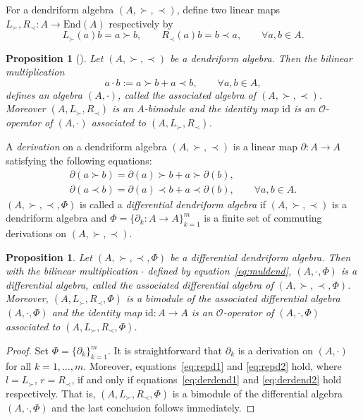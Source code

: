 \documentclass[pdftex]{sigma}
\numberwithin{equation}{section}
\newtheorem{Proposition}[Theorem]{Proposition}
{ \theoremstyle{definition}
	\newtheorem{Definition}[Theorem]{Definition}
	\newtheorem{Note}[Theorem]{Note}
	\newtheorem{Example}[Theorem]{Example}
	\newtheorem{Remark}[Theorem]{Remark} }
\newcommand{\id}{\mathrm{id}}
\newcommand{\End}{\mathrm{End}}
\begin{document}
For a dendriform algebra $(A, \succ, \prec)$, define two linear
maps $L_\succ, R_\prec\colon A \to \End(A)$ respectively by
\begin{equation*}
	L_\succ (a)b = a \succ b, \qquad R_\prec(a)b = b\prec a,\qquad \forall a, b\in A.
\end{equation*}

\begin{Proposition}[\cite{BaiDouble,Loday2001Dialgebras}]
 Let $(A, \succ, \prec)$ be a dendriform algebra.
 Then the bilinear multiplication
 \begin{equation}
 a \cdot b := a \succ b + a \prec b, \qquad \forall a, b \in A, \label{eq:muldend}
 \end{equation}
 defines an algebra $(A, \cdot)$, called the \textit{associated algebra} of $(A, \succ, \prec)$.
 Moreover $(A, L_\succ, R_\prec)$ is an $A$-bimodule and
 the identity map $\id$ is an $\mathcal{O}$-operator of $(A, \cdot)$ associated to $(A, L_\succ, R_\prec)$.
\end{Proposition}


\begin{Definition}
	A \textit{derivation} on a dendriform algebra $(A, \succ, \prec)$ is a linear map $\partial\colon A\rightarrow A$ satisfying the following equations:
 \begin{gather}
 \partial(a \succ b) = \partial(a) \succ b + a \succ \partial(b), \label{eq:derdend1} \\
 \partial(a \prec b) = \partial(a) \prec b + a \prec \partial(b), \qquad \forall a, b \in A. \label{eq:derdend2}
 \end{gather}
 $(A, \succ, \prec, \Phi)$ is called a \textit{differential dendriform algebra} if
 $(A, \succ, \prec)$ is a dendriform algebra and $\Phi = \{\partial_k\colon A \to A\}_{k=1}^m$ is a finite set of commuting derivations on $(A, \succ, \prec)$.
\end{Definition}

\begin{Proposition}\label{pro:assda}
 Let $(A, \succ, \prec, \Phi)$ be a differential dendriform algebra.
 Then with the bilinear multiplication $\cdot$ defined by equation~\eqref{eq:muldend},
 $(A, \cdot, \Phi)$ is a differential algebra,
 called the \textit{associated differential algebra of $(A, \succ, \prec, \Phi)$}.
 Moreover, $(A, L_\succ, R_\prec, \Phi)$ is a bimodule of the associated differential algebra $(A, \cdot, \Phi)$
 and the identity map $\id\colon A \to A$ is an $\mathcal{O}$-operator of $(A, \cdot, \Phi)$ associated to $(A, L_\succ, R_\prec, \Phi)$.
\end{Proposition}
\begin{proof}
	Set $\Phi = \{\partial_k\}_{k=1}^m$.
 It is straightforward that $\partial_k$ is a derivation on $(A, \cdot)$ for all $k=1, \dots, m$.
 Moreover, equations~\eqref{eq:repd1} and \eqref{eq:repd2} hold,
 where $l = L_\succ$, $r = R_\prec$,
 if and only if equations~\eqref{eq:derdend1} and \eqref{eq:derdend2} hold respectively.
 That is, $(A, L_\succ, R_\prec, \Phi)$ is a bimodule of the differential algebra $(A, \cdot, \Phi)$
 and the last conclusion follows immediately.
\end{proof}
\end{document}
